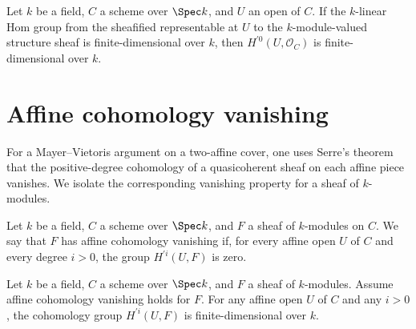 \begin{theorem}\leanok
  \label{thm:Scheme_module_finite_HModule_prime_zero_curve}
  Let \(k\) be a field, \(C\) a scheme over \(\Spec k\), and \(U\) an open of \(C\). If the \(k\)-linear Hom group from the sheafified representable at \(U\) to the \(k\)-module-valued structure sheaf is finite-dimensional over \(k\), then \(H^{\prime 0}(U, \mathcal O_C)\) is finite-dimensional over \(k\).
\end{theorem}

\section{Affine cohomology vanishing}
\label{sec:IsAffineHModuleVanishing_iter040}

For a Mayer--Vietoris argument on a two-affine cover, one uses Serre's theorem that the positive-degree cohomology of a quasicoherent sheaf on each affine piece vanishes. We isolate the corresponding vanishing property for a sheaf of \(k\)-modules.

\begin{definition}\leanok
  \label{thm:Scheme_IsAffineHModuleVanishing}
  Let \(k\) be a field, \(C\) a scheme over \(\Spec k\), and \(F\) a sheaf of \(k\)-modules on \(C\). We say that \(F\) has affine cohomology vanishing if, for every affine open \(U\) of \(C\) and every degree \(i > 0\), the group \(H^{\prime i}(U, F)\) is zero.
\end{definition}

\begin{theorem}\leanok
  \label{thm:Scheme_module_finite_HModule_prime_of_isAffineHModuleVanishing}
  Let \(k\) be a field, \(C\) a scheme over \(\Spec k\), and \(F\) a sheaf of \(k\)-modules. Assume affine cohomology vanishing holds for \(F\). For any affine open \(U\) of \(C\) and any \(i > 0\), the cohomology group \(H^{\prime i}(U, F)\) is finite-dimensional over \(k\).
\end{theorem}

